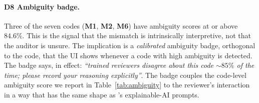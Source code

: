 \documentclass[11pt,a4paper]{article}
\newcommand{\code}[1]{\textsf{\textbf{#1}}}
\begin{document}
\paragraph{\textbf{D8} Ambiguity badge.}
Three of the seven codes (\code{M1}, \code{M2}, \code{M6}) have
ambiguity scores at or above $84.6\%$. This is the signal that the
mismatch is intrinsically interpretive, not that the auditor is
unsure. The implication is a \emph{calibrated} ambiguity badge,
orthogonal to the code, that the UI shows whenever a code with high
ambiguity is detected. The badge says, in effect: \emph{``trained
reviewers disagree about this code $\sim\!85\%$ of the time; please
record your reasoning explicitly''}. The badge couples the code-level
ambiguity score we report in Table~\ref{tab:ambiguity} to the
reviewer's interaction in a way that has the same shape as
\citet{liao2020questioning}'s explainable-AI prompts.
\end{document}
